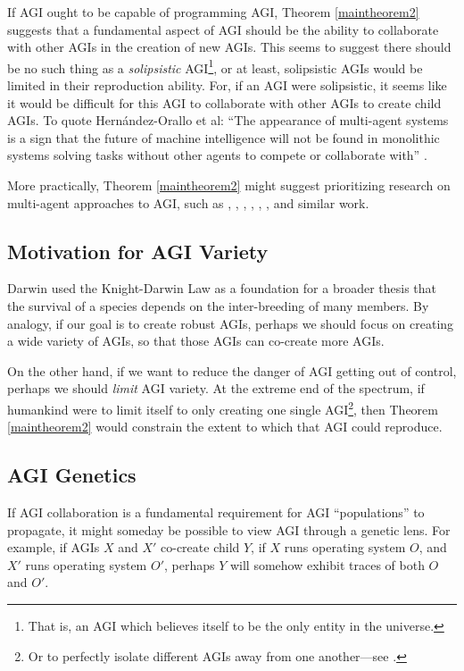 \documentclass[runningheads]{llncs}
\begin{document}
If AGI ought to be capable of programming AGI,
Theorem \ref{maintheorem2} suggests
that a fundamental aspect of AGI should be the ability to collaborate with other
AGIs in the creation of new AGIs.
This seems to suggest there should be no
such thing as a \emph{solipsistic} AGI\footnote{That is, an AGI which believes itself
to be the only entity in the universe.}, or at least, solipsistic AGIs would be
limited in their reproduction ability.
For, if an AGI were solipsistic, it
seems like it would be difficult for this AGI to collaborate with other AGIs
to create child AGIs.
To quote Hern{\'a}ndez-Orallo et al: ``The appearance of multi-agent systems is a sign that
the future of machine intelligence will not be found in monolithic systems
solving tasks without other agents to compete or collaborate with''
\cite{hernandez2011more}.

More practically,
Theorem \ref{maintheorem2} might suggest
prioritizing research on multi-agent approaches to AGI, such as
\cite{castelfranchi1998modelling}, \cite{hernandez2011more},
\cite{hibbard2011societies},
\cite{kolonin2018reputation},
\cite{potyka2016group},
\cite{thorisson2004constructionist},
and similar work.

\subsection{Motivation for AGI Variety}

Darwin used the Knight-Darwin Law as a foundation for
a broader thesis that the survival of a
species depends on the inter-breeding of many members.
By analogy, if our goal is to create robust AGIs, perhaps
we should focus on creating a wide variety of AGIs, so that
those AGIs can co-create more AGIs.

On the other hand, if we want to reduce the danger of AGI getting out of control,
perhaps we should \emph{limit} AGI variety. At the extreme end
of the spectrum, if humankind were to limit itself to only creating one single
AGI\footnote{Or to perfectly isolate
different AGIs away from
one another---see \cite{yampolskiy2012leakproofing}.}, then
Theorem \ref{maintheorem2} would constrain the extent to which
that AGI could reproduce.


\subsection{AGI Genetics}

If AGI collaboration
is a fundamental requirement for AGI ``populations'' to propagate, it might
someday be possible to view AGI through a genetic lens. For example, if AGIs $X$ and $X'$
co-create child $Y$,
if $X$ runs operating
system $O$, and $X'$ runs operating system $O'$, perhaps $Y$
will somehow exhibit traces of both $O$ and $O'$.
\end{document}
